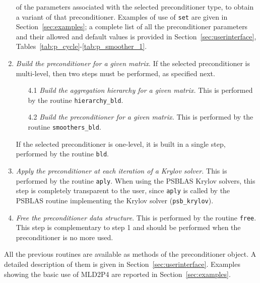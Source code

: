 \begin{enumerate}
  of the parameters associated with the selected preconditioner type, to obtain a variant
  of that preconditioner. Examples of use of \verb|set| are given in
  Section~\ref{sec:examples}; a complete list of all the
  preconditioner parameters and their allowed and default values is provided in 
  Section~\ref{sec:userinterface}, Tables~\ref{tab:p_cycle}-\ref{tab:p_smoother_1}.
\item \emph{Build the preconditioner for a given matrix}. If the selected preconditioner
 is multi-level, then two steps must be performed, as specified next.
\begin{enumerate}
\item[4.1] \emph{Build the aggregation hierarchy for a given matrix.} This is
performed by the routine \verb|hierarchy_bld|.
\item[4.2] \emph{Build the preconditioner for a given matrix.} This is performed
by the routine \verb|smoothers_bld|.
\end{enumerate}
 If the selected preconditioner is one-level, it is built in a single step,
performed by the routine \verb|bld|.
\item \emph{Apply the preconditioner at each iteration of a Krylov solver.}
  This is performed by the routine \verb|aply|. When using the PSBLAS Krylov solvers,
  this step is completely transparent to the user, since \verb|aply| is called
  by the PSBLAS routine implementing the Krylov solver (\verb|psb_krylov|).
\item \emph{Free the preconditioner data structure}. This is performed by
  the routine \verb|free|. This step is complementary to step 1 and should
  be performed when the preconditioner is no more used.
\end{enumerate}

All the previous routines are available as methods of the preconditioner object.
A detailed description of them is given in Section~\ref{sec:userinterface}.
Examples showing the basic use of MLD2P4 are reported in Section~\ref{sec:examples}.

